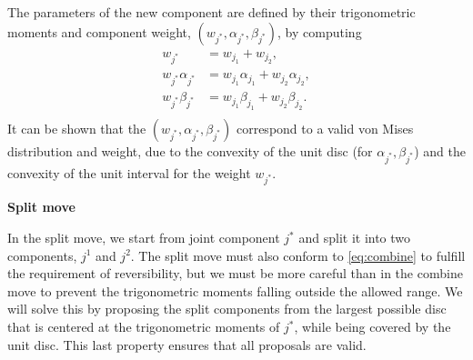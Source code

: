 The parameters of the new component are defined by their trigonometric moments and component weight, $(w_{j^*}, \alpha_{j^*}, \beta_{j^*})$, by computing
\begin{equation}
\label{eq:combine}
\begin{split}
w_{j^*} &= w_{j_1} + w_{j_2}, \\
w_{j^*} \alpha_{j^*} &= w_{j_1} \alpha_{j_1} + w_{j_2} \alpha_{j_2}, \\
w_{j^*} \beta_{j^*} &= w_{j_1} \beta_{j_1} + w_{j_2} \beta_{j_2}. \\
\end{split}
\end{equation}
It can be shown that the $(w_{j^*}, \alpha_{j^*}, \beta_{j^*})$ correspond to a valid von Mises distribution and weight, due to the convexity of the unit disc (for $\alpha_{j^*}, \beta_{j^*}$) and the convexity of the unit interval for the weight $w_{j^*}$.



\vspace{.4cm}

\textbf{Split move}

In the split move, we start from joint component $j^*$ and split it into two components, $j^1$ and $j^2$. The split move must also conform to \eqref{eq:combine} to fulfill the requirement of reversibility, but we must be more careful than in the combine move to prevent the trigonometric moments falling outside the allowed range. We will solve this by proposing the split components from the largest possible disc that is centered at the trigonometric moments of $j^*$, while being covered by the unit disc. This last property ensures that all proposals are valid.

